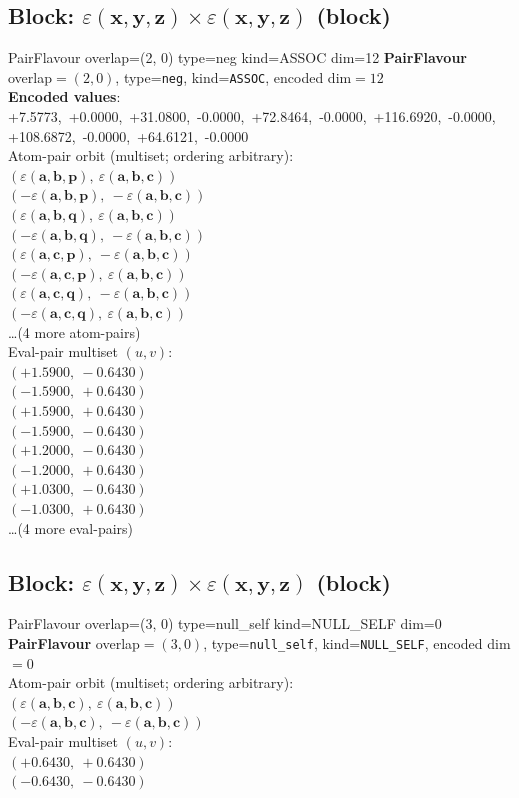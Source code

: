 \documentclass[a4paper,11pt]{article}
\newcommand{\kblbmcpggoncpf}[3]{\varepsilon(\mathbf{#1},\mathbf{#2},\mathbf{#3})}
\begin{document}
\subsection{Block: $\kblbmcpggoncpf{x}{y}{z} \times \kblbmcpggoncpf{x}{y}{z}$  (block)}
    PairFlavour  overlap=(2, 0)  type=neg  kind=ASSOC  dim=12
\textbf{PairFlavour} overlap$=(2, 0)$, type=\texttt{neg}, kind=\texttt{ASSOC}, encoded dim$=12$\\
\textbf{      Encoded values}: +7.5773,\ +0.0000,\ +31.0800,\ -0.0000,\ +72.8464,\ -0.0000,\ +116.6920,\ -0.0000,\ +108.6872,\ -0.0000,\ +64.6121,\ -0.0000\\
\quad Atom-pair orbit (multiset; ordering arbitrary):\\
$(\kblbmcpggoncpf{a}{b}{p},\ \kblbmcpggoncpf{a}{b}{c})$\\
$(-\kblbmcpggoncpf{a}{b}{p},\ -\kblbmcpggoncpf{a}{b}{c})$\\
$(\kblbmcpggoncpf{a}{b}{q},\ \kblbmcpggoncpf{a}{b}{c})$\\
$(-\kblbmcpggoncpf{a}{b}{q},\ -\kblbmcpggoncpf{a}{b}{c})$\\
$(\kblbmcpggoncpf{a}{c}{p},\ -\kblbmcpggoncpf{a}{b}{c})$\\
$(-\kblbmcpggoncpf{a}{c}{p},\ \kblbmcpggoncpf{a}{b}{c})$\\
$(\kblbmcpggoncpf{a}{c}{q},\ -\kblbmcpggoncpf{a}{b}{c})$\\
$(-\kblbmcpggoncpf{a}{c}{q},\ \kblbmcpggoncpf{a}{b}{c})$\\
\quad \ldots (4 more atom-pairs)\\
\quad Eval-pair multiset $(u, v)$:\\
$(+1.5900,\ -0.6430)$\\
$(-1.5900,\ +0.6430)$\\
$(+1.5900,\ +0.6430)$\\
$(-1.5900,\ -0.6430)$\\
$(+1.2000,\ -0.6430)$\\
$(-1.2000,\ +0.6430)$\\
$(+1.0300,\ -0.6430)$\\
$(-1.0300,\ +0.6430)$\\
\quad \ldots (4 more eval-pairs)\\

\subsection{Block: $\kblbmcpggoncpf{x}{y}{z} \times \kblbmcpggoncpf{x}{y}{z}$  (block)}
    PairFlavour  overlap=(3, 0)  type=null\_self  kind=NULL\_SELF  dim=0
\textbf{PairFlavour} overlap$=(3, 0)$, type=\texttt{null\_self}, kind=\texttt{NULL\_SELF}, encoded dim$=0$\\
\quad Atom-pair orbit (multiset; ordering arbitrary):\\
$(\kblbmcpggoncpf{a}{b}{c},\ \kblbmcpggoncpf{a}{b}{c})$\\
$(-\kblbmcpggoncpf{a}{b}{c},\ -\kblbmcpggoncpf{a}{b}{c})$\\
\quad Eval-pair multiset $(u, v)$:\\
$(+0.6430,\ +0.6430)$\\
$(-0.6430,\ -0.6430)$\\
\end{document}
